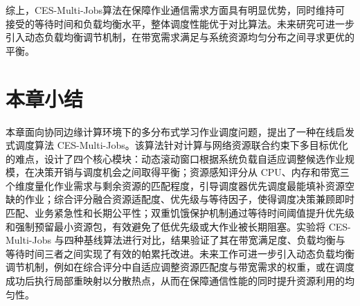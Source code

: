 综上，CES-Multi-Jobs算法在保障作业通信需求方面具有明显优势，同时维持可接受的等待时间和负载均衡水平，整体调度性能优于对比算法。未来研究可进一步引入动态负载均衡调节机制，在带宽需求满足与系统资源均匀分布之间寻求更优的平衡。

\section{本章小结}
本章面向协同边缘计算环境下的多分布式学习作业调度问题，提出了一种在线启发式调度算法 CES-Multi-Jobs。该算法针对计算与网络资源联合约束下多目标优化的难点，设计了四个核心模块：动态滚动窗口根据系统负载自适应调整候选作业规模，在决策开销与调度机会之间取得平衡；资源感知评分从 CPU、内存和带宽三个维度量化作业需求与剩余资源的匹配程度，引导调度器优先调度最能填补资源空缺的作业；综合评分融合资源适配度、优先级与等待因子，使得调度决策兼顾即时匹配、业务紧急性和长期公平性；双重饥饿保护机制通过等待时间阈值提升优先级和强制预留最小资源包，有效避免了低优先级或大作业被长期阻塞。实验将 CES-Multi-Jobs 与四种基线算法进行对比，结果验证了其在带宽满足度、负载均衡与等待时间三者之间实现了有效的帕累托改进。未来工作可进一步引入动态负载均衡调节机制，例如在综合评分中自适应调整资源匹配度与带宽需求的权重，或在调度成功后执行局部重映射以分散热点，从而在保障通信性能的同时提升资源利用的均匀性。